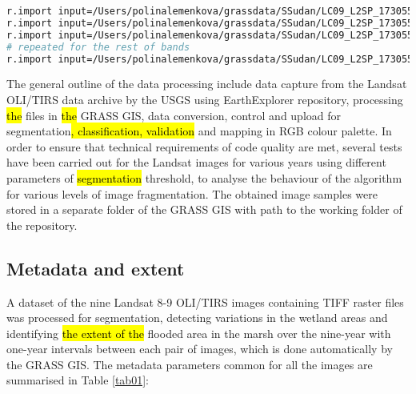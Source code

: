 \documentclass[sustainability,article,submit,pdftex,moreauthors]{Definitions/mdpi}
\begin{document}
\begin{lstlisting}[language=bash,caption=GRASS GIS code for importing data for the Landsat OLI/TIRS bands,style=mystyle,label={lst01}]
r.import input=/Users/polinalemenkova/grassdata/SSudan/LC09_L2SP_173055_20230514_20230516_02_T1_SR_B1.TIF output=L9_2023_01 resample=bilinear extent=region resolution=region --overwrite
r.import input=/Users/polinalemenkova/grassdata/SSudan/LC09_L2SP_173055_20230514_20230516_02_T1_SR_B2.TIF output=L9_2023_02 extent=region resolution=region
r.import input=/Users/polinalemenkova/grassdata/SSudan/LC09_L2SP_173055_20230514_20230516_02_T1_SR_B3.TIF output=L9_2023_03 extent=region resolution=region
# repeated for the rest of bands
r.import input=/Users/polinalemenkova/grassdata/SSudan/LC09_L2SP_173055_20230514_20230516_02_T1_SR_B7.TIF output=L9_2023_07 extent=region resolution=region
\end{lstlisting}

The general outline of the data processing include\hl{ }data capture from the Landsat OLI/TIRS data archive by the USGS using EarthExplorer repository, processing \hl{the }files in \hl{the }GRASS GIS, data conversion, control and upload for segmentation\hl{, classification, validation} and mapping in RGB colour palette. In order to ensure that\hl{ }technical requirements of code quality are met, several tests have been carried out for the Landsat images\hl{ }for various years using different parameters of \hl{segmentation }threshold, to analyse the behaviour of the algorithm for various levels of image fragmentation. The obtained image samples were stored in a separate folder of the GRASS GIS with path to the working folder of the repository.


\subsection{Metadata and extent}
A dataset of the nine Landsat 8-9 OLI/TIRS images containing TIFF raster files was processed for segmentation, detecting variations in the wetland areas and identifying \hl{the extent of the }flooded area in the marsh over the nine-year with one-year intervals between each pair of images, which is done automatically by the GRASS GIS. The metadata parameters common for all the images are summarised in Table \ref{tab01}: 
\end{document}
